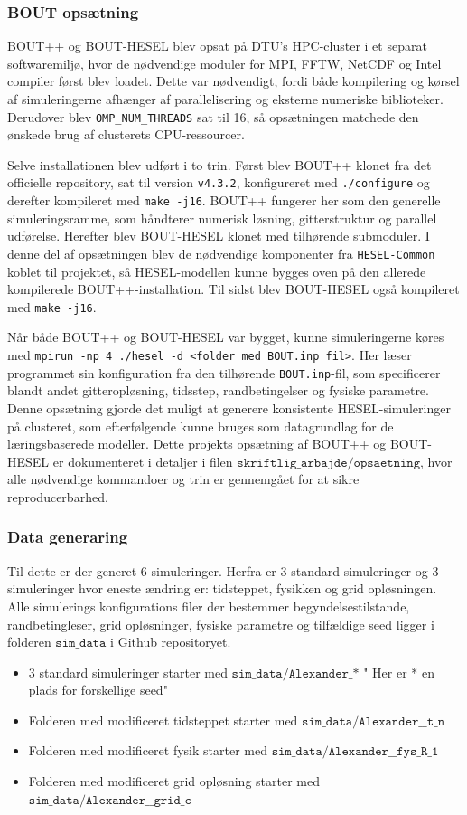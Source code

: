 \subsubsection{BOUT opsætning}
BOUT++ og BOUT-HESEL blev opsat på DTU's HPC-cluster i et separat softwaremiljø, hvor de nødvendige moduler for MPI, FFTW, NetCDF og Intel compiler først blev loadet. Dette var nødvendigt, fordi både kompilering og kørsel af simuleringerne afhænger af parallelisering og eksterne numeriske biblioteker. Derudover blev \texttt{OMP\_NUM\_THREADS} sat til 16, så opsætningen matchede den ønskede brug af clusterets CPU-ressourcer.

Selve installationen blev udført i to trin. Først blev BOUT++ klonet fra det officielle repository, sat til version \texttt{v4.3.2}, konfigureret med \texttt{./configure} og derefter kompileret med \texttt{make -j16}. BOUT++ fungerer her som den generelle simuleringsramme, som håndterer numerisk løsning, gitterstruktur og parallel udførelse. Herefter blev BOUT-HESEL klonet med tilhørende submoduler. I denne del af opsætningen blev de nødvendige komponenter fra \texttt{HESEL-Common} koblet til projektet, så HESEL-modellen kunne bygges oven på den allerede kompilerede BOUT++-installation. Til sidst blev BOUT-HESEL også kompileret med \texttt{make -j16}.

Når både BOUT++ og BOUT-HESEL var bygget, kunne simuleringerne køres med \texttt{mpirun -np 4 ./hesel -d <folder med BOUT.inp fil>}. Her læser programmet sin konfiguration fra den tilhørende \texttt{BOUT.inp}-fil, som specificerer blandt andet gitteropløsning, tidsstep, randbetingelser og fysiske parametre. Denne opsætning gjorde det muligt at generere konsistente HESEL-simuleringer på clusteret, som efterfølgende kunne bruges som datagrundlag for de læringsbaserede modeller.
Dette projekts opsætning af BOUT++ og BOUT-HESEL er dokumenteret i detaljer i filen $\texttt{skriftlig\_arbajde/opsaetning}$, hvor alle nødvendige kommandoer og trin er gennemgået for at sikre reproducerbarhed.


\subsubsection{Data generaring}
Til dette er der generet 6 simuleringer. Herfra er 3 standard simuleringer og 3 simuleringer hvor eneste ændring er: tidsteppet, fysikken og grid opløsningen.
Alle simulerings konfigurations filer der bestemmer begyndelsestilstande, randbetingleser,
grid opløsninger, fysiske parametre og tilfældige seed ligger i folderen $\texttt{sim\_data}$ i Github repositoryet.
\begin{itemize}
    \item 3 standard simuleringer starter med $\texttt{sim\_data/Alexander\_*}$ " Her er * en plads for forskellige seed"
    \item Folderen med modificeret tidsteppet starter med $\texttt{sim\_data/Alexander\_\_t\_n}$
    \item Folderen med modificeret fysik starter med $\texttt{sim\_data/Alexander\_\_fys\_R\_1}$
    \item Folderen med modificeret grid opløsning starter med $\texttt{sim\_data/Alexander\_\_grid\_c}$
\end{itemize}

